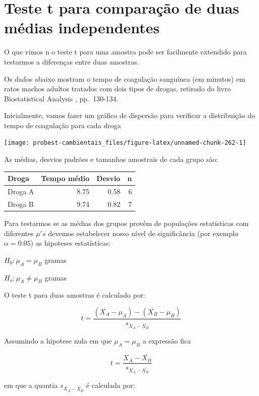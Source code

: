 \documentclass[
]{book}
\begin{document}
\hypertarget{teste-t-para-comparauxe7uxe3o-de-duas-muxe9dias-independentes}{%
\section{Teste t para comparação de duas médias independentes}\label{teste-t-para-comparauxe7uxe3o-de-duas-muxe9dias-independentes}}

O que vimos n o teste t para uma amostra pode ser facilmente extendido para testarmos a diferenças entre duas amostras.

Os dados abaixo mostram o tempo de coagulação sanguínea (em minutos) em ratos machos adultos tratados com dois tipos de drogas, retirado do livro Biostatistical Analysis \citep{zar2010biostatistical}, pp.~130-134.

Inicialmente, vamos fazer um gráfico de dispersão para verificar a distribuição do tempo de coagulação para cada droga

\begin{center}\texttt{[image: probest-cambientais\_files/figure-latex/unnamed-chunk-262-1]} \end{center}

As médias, desvios padrões e tamanhos amostrais de cada grupo são:

\begin{tabular}{l|r|r|r}
\hline
Droga & Tempo médio & Desvio & n\\
\hline
Droga A & 8.75 & 0.58 & 6\\
\hline
Droga B & 9.74 & 0.82 & 7\\
\hline
\end{tabular}

Para testarmos se as médias dos grupos provém de populações estatísticas com diferentes \(\mu's\) devemos estabelecer nosso nível de significância (por exemplo \(\alpha = 0.05\)) as hipoteses estatísticas:

\(H_0: \mu_A = \mu_B\) gramas

\(H_a: \mu_A \ne \mu_B\) gramas

O teste t para duas amostras é calculado por:

\[t = \frac{(\overline{X_A} - \mu_A) - (\overline{X_B} - \mu_B)}{s_{\overline{X_A}-\overline{X_B}}}\]

Assumindo a hipotese nula em que \(\mu_A = \mu_B\) a expressão fica

\[t = \frac{\overline{X_A} - \overline{X_B}}{s_{\overline{X_A}-\overline{X_B}}}\]

em que a quantia \(s_{\overline{X_A}-\overline{X_B}}\) é calculada por:
\end{document}
